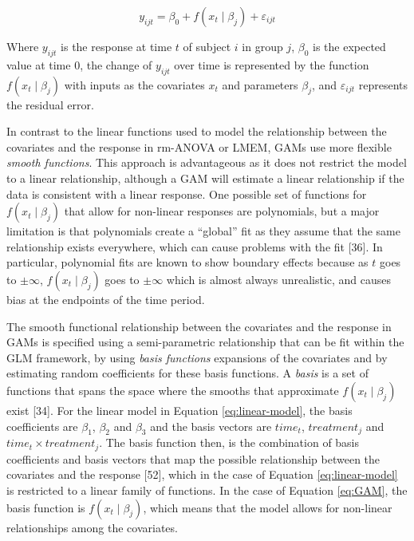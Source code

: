 \documentclass[
]{article}
\begin{document}
\begin{equation}
  y_{ijt}=\beta_0+f(x_t\mid \beta_j)+\varepsilon_{ijt}
  \label{eq:GAM}
\end{equation}

Where \(y_{ijt}\) is the response at time \(t\) of subject \(i\) in group \(j\), \(\beta_0\) is the expected value at time 0, the change of \(y_{ijt}\) over time is represented by the function \(f(x_t\mid \beta_j)\) with inputs as the covariates \(x_t\) and parameters \(\beta_j\), and \(\varepsilon_{ijt}\) represents the residual error.

In contrast to the linear functions used to model the relationship between the covariates and the response in rm-ANOVA or LMEM, GAMs use more flexible \emph{smooth functions}. This approach is advantageous as it does not restrict the model to a linear relationship, although a GAM will estimate a linear relationship if the data is consistent with a linear response. One possible set of functions for \(f(x_t\mid \beta_j)\) that allow for non-linear responses are polynomials, but a major limitation is that polynomials create a ``global'' fit as they assume that the same relationship exists everywhere, which can cause problems with the fit {[}36{]}. In particular, polynomial fits are known to show boundary effects because as \(t\) goes to \(\pm \infty\), \(f(x_t \mid \beta_j)\) goes to \(\pm \infty\) which is almost always unrealistic, and causes bias at the endpoints of the time period.

The smooth functional relationship between the covariates and the response in GAMs is specified using a semi-parametric relationship that can be fit within the GLM framework, by using \emph{basis functions} expansions of the covariates and by estimating random coefficients for these basis functions. A \emph{basis} is a set of functions that spans the space where the smooths that approximate \(f(x_t \mid \beta_j)\) exist {[}34{]}. For the linear model in Equation \eqref{eq:linear-model}, the basis coefficients are \(\beta_1\), \(\beta_2\) and \(\beta_3\) and the basis vectors are \(time_t\), \(treatment_j\) and \(time_t \times treatment_j\). The basis function then, is the combination of basis coefficients and basis vectors that map the possible relationship between the covariates and the response {[}52{]}, which in the case of Equation \eqref{eq:linear-model} is restricted to a linear family of functions. In the case of Equation \eqref{eq:GAM}, the basis function is \(f(x_t\mid \beta_j)\), which means that the model allows for non-linear relationships among the covariates.
\end{document}
